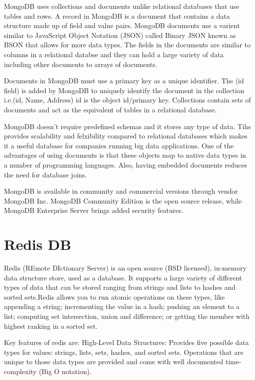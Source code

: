MongoDB uses collections and documents unlike relational databases that use tables and rows. A record in MongoDB is a document that contains a data structure made up of field and value pairs. MongoDB documents use a varient similar to JavaScript Object Notation (JSON) called Binary JSON known as BSON that allows for more data types. The fields in the documents are similar to columns in a relational databse and they can hold a large variety of data including other documents to arrays of documents.\newline

Documents in MongoDB must use a primary key as a unique identifier.
The (id field) is added by MongoDB to uniquely identify the document in the collection i.e.(id, Name, Address) id is the object id/primary key. Collections contain sets of documents and act as the equivalent of tables in a relational database.\newline

MongoDB doesn't require predefined schemas and it stores any type of data. Tihs provides scalability and felxibility compared to relational databases which makes it a useful database for companies running big data applications. One of the advantages of using documents is that these objects map to native data types in a number of programming languages. Also, having embedded documents reduces the need for database joins.\newline

MongoDB is available in community and commercial versions through vendor MongoDB Inc. MongoDB Community Edition is the open source release, while MongoDB Enterprise Server brings added security features.\newline

\section {Redis DB}
Redis (REmote DIctionary Server) is an open source (BSD licensed), in-memory data structure store, used as a database. It supports a large variety of different types of data that can be stored ranging from strings and lists to hashes and sorted sets.Redis allows you to run atomic operations on these types, like appending a string; incrementing the value in a hash; pushing an element to a list; computing set intersection, union and difference; or getting the member with highest ranking in a sorted set.
\newline

Key features of redis are:\newline
High-Level Data Structures:  Provides five possible data types for values: strings, lists, sets, hashes, and sorted sets. Operations that are unique to those data types are provided and come with well documented time-complexity (Big O notation).\newline

